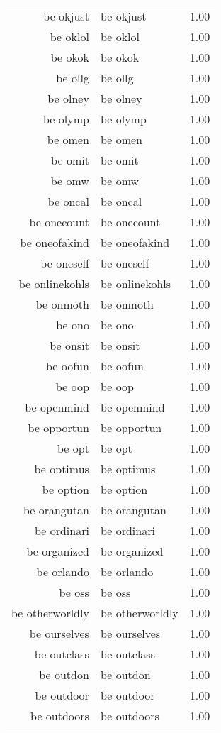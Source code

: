 \begin{table}[ht]
\begin{tabular}{rlr}
  be okjust & be okjust & 1.00 \\ 
  be oklol & be oklol & 1.00 \\ 
  be okok & be okok & 1.00 \\ 
  be ollg & be ollg & 1.00 \\ 
  be olney & be olney & 1.00 \\ 
  be olymp & be olymp & 1.00 \\ 
  be omen & be omen & 1.00 \\ 
  be omit & be omit & 1.00 \\ 
  be omw & be omw & 1.00 \\ 
  be oncal & be oncal & 1.00 \\ 
  be onecount & be onecount & 1.00 \\ 
  be oneofakind & be oneofakind & 1.00 \\ 
  be oneself & be oneself & 1.00 \\ 
  be onlinekohls & be onlinekohls & 1.00 \\ 
  be onmoth & be onmoth & 1.00 \\ 
  be ono & be ono & 1.00 \\ 
  be onsit & be onsit & 1.00 \\ 
  be oofun & be oofun & 1.00 \\ 
  be oop & be oop & 1.00 \\ 
  be openmind & be openmind & 1.00 \\ 
  be opportun & be opportun & 1.00 \\ 
  be opt & be opt & 1.00 \\ 
  be optimus & be optimus & 1.00 \\ 
  be option & be option & 1.00 \\ 
  be orangutan & be orangutan & 1.00 \\ 
  be ordinari & be ordinari & 1.00 \\ 
  be organized & be organized & 1.00 \\ 
  be orlando & be orlando & 1.00 \\ 
  be oss & be oss & 1.00 \\ 
  be otherworldly & be otherworldly & 1.00 \\ 
  be ourselves & be ourselves & 1.00 \\ 
  be outclass & be outclass & 1.00 \\ 
  be outdon & be outdon & 1.00 \\ 
  be outdoor & be outdoor & 1.00 \\ 
  be outdoors & be outdoors & 1.00 \\ 

\end{tabular}
\end{table}
